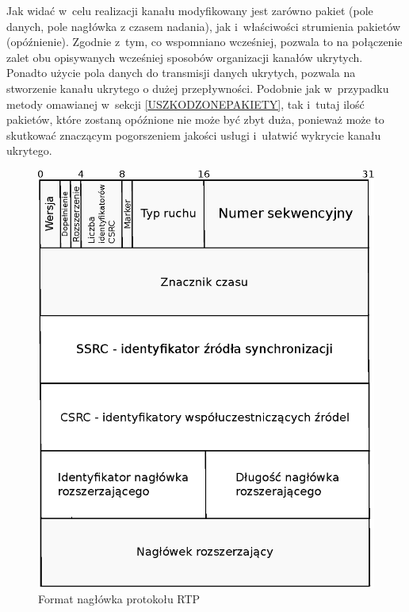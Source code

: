 \documentclass[a4paper, twoside, 12pt]{report}
\begin{document}
        Jak widać w~celu realizacji kanału modyfikowany jest zarówno pakiet (pole danych,
        pole nagłówka z czasem nadania), jak i~właściwości strumienia pakietów (opóźnienie).
        Zgodnie z~tym, co wspomniano wcześniej, pozwala to na połączenie zalet obu opisywanych
        wcześniej sposobów organizacji kanałów ukrytych. Ponadto użycie pola danych
        do transmisji danych ukrytych, pozwala na stworzenie kanału ukrytego o
        dużej przepływności. Podobnie jak w~przypadku metody omawianej w~sekcji
        \ref{USZKODZONEPAKIETY}, tak i~tutaj ilość pakietów, które zostaną opóźnione
        nie może być zbyt duża, ponieważ może to skutkować znaczącym pogorszeniem
        jakości usługi i~ułatwić wykrycie kanału ukrytego.

        \begin{figure}[h]
                \centering
                \includegraphics[scale=0.8]{rtp_header}
                \caption{Format nagłówka protokołu RTP}
                \label{RTPHEADER}
        \end{figure}
\end{document}
